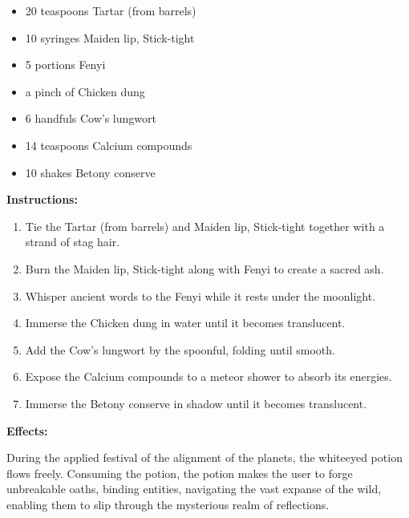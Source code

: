 \documentclass{article}
\begin{document}
\begin{itemize}
  \item 20 teaspoons Tartar (from barrels)
  \item 10 syringes Maiden lip, Stick-tight
  \item 5 portions Fenyi
  \item a pinch of Chicken dung
  \item 6 handfuls Cow's lungwort
  \item 14 teaspoons Calcium compounds
  \item 10 shakes Betony conserve
\end{itemize}

\textbf{Instructions:}

\begin{enumerate}
  \item Tie the Tartar (from barrels) and Maiden lip, Stick-tight together with a strand of stag hair.
  \item Burn the Maiden lip, Stick-tight along with Fenyi to create a sacred ash.
  \item Whisper ancient words to the Fenyi while it rests under the moonlight.
  \item Immerse the Chicken dung in water until it becomes translucent.
  \item Add the Cow's lungwort by the spoonful, folding until smooth.
  \item Expose the Calcium compounds to a meteor shower to absorb its energies.
  \item Immerse the Betony conserve in shadow until it becomes translucent.
\end{enumerate}

\textbf{Effects:}

During the applied festival of the alignment of the planets, the whiteeyed potion flows freely. Consuming the potion, the potion makes the user to forge unbreakable oaths, binding entities, navigating the vast expanse of the wild, enabling them to slip through the mysterious realm of reflections.
\end{document}
